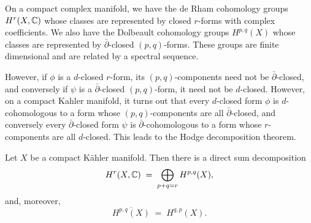 \documentclass[12pt]{article}
\begin{document}
On a compact complex manifold, we have the de Rham cohomology groups $H^r(X, \mathbb{C})$ whose classes are represented by closed $r$-forms with complex coefficients. We also have the Dolbeault cohomology groups $H^{p,q}(X)$ whose classes are represented by $\bar{\partial}$-closed $(p,q)$-forms. These groups are finite dimensional and are related by a spectral sequence. 

However, if $\phi$ is a $d$-closed $r$-form, its $(p,q)$-components need not be $\bar{\partial}$-closed, and conversely if $\psi$ is a $\bar{\partial}$-closed $(p,q)$-form, it need not be $d$-closed. However, on a compact Kahler manifold, it turns out that every $d$-closed form $\phi$ is $d$-cohomologous to a form whose $(p,q)$-components are all $\bar{\partial}$-closed, and conversely every $\bar{\partial}$-closed form $\psi$ is $\bar{\partial}$-cohomologous to a form whose $r$-components are all $d$-closed. This leads to the Hodge decomposition theorem.

\begin{theorem}\label{thm:hodge}
Let $X$ be a compact K\"ahler manifold. Then there is a
direct sum decomposition
\begin{equation}\label{eq:hodge-decomp}
H^r(X,\mathbb{C}) \;=\; \bigoplus_{p+q=r} H^{p,q}(X),
\end{equation}
and, moreover,
\begin{equation}\label{eq:conj}
\overline{H^{p,q}(X)} \;=\; H^{q,p}(X).
\end{equation}
\end{theorem}
\end{document}
